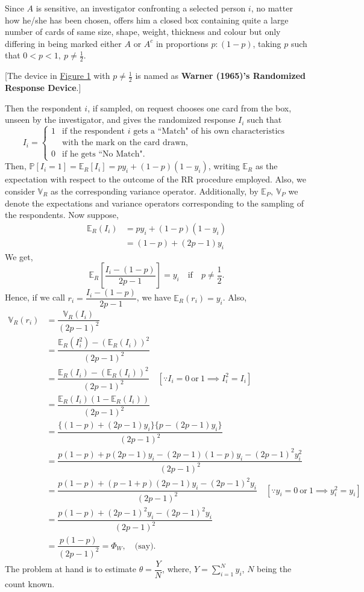 \documentclass[12pt]{article}
\newcommand{\prob}{\mathbb{P}}
\newcommand{\E}{\mathbb{E}}
\newcommand{\Var}{\mathbb{V}}
\theoremstyle{definition}
\begin{document}
Since $A$ is sensitive, an investigator confronting a selected person $i$, no matter how he/she has been chosen, offers him a closed box containing quite a large number of cards of same size, shape, weight, thickness and colour but only differing in being marked either $A$ or $A^c$ in proportions $p:(1-p)$, taking $p$ such that $0<p<1,\ p\neq\frac{1}{2}$.

[The device in \hyperref[SS1]{Figure 1} with $p\neq\frac{1}{2}$ is named as \textbf{Warner (1965)'s Randomized Response Device}.]

Then the respondent $i$, if sampled, on request chooses one card from the box, unseen by the investigator, and gives the randomized response $I_i$ such that
$$I_i= 
\begin{cases}
1 & \text{if the respondent $i$ gets a ``Match" of his own characteristics }\\
& \text{with the mark on the card drawn,}\\
0 & \text{if he gets ``No Match".}
\end{cases}$$
Then, $\prob[I_i=1]=\E_R[I_i]=p y_i +(1-p)(1-y_i)$, writing $\E_R$ as the expectation with respect to the outcome of the RR procedure employed. Also, we consider $\Var_R$ as the corresponding variance operator. Additionally, by $\E_P,\ \Var_P$ we denote the expectations and variance operators corresponding to the sampling of the respondents. Now suppose,
\begin{align*}
    \E_R(I_i) & = py_i +(1-p)(1-y_i)\\
    & = (1-p)+(2p-1)y_i
\end{align*}
We get, 
$$\E_R \left[ \dfrac{I_i-(1-p)}{2p-1} \right]=y_i\quad \text{if}\quad p\neq \frac{1}{2}.$$
Hence, if we call $r_i = \dfrac{I_i-(1-p)}{2p-1}$, we have $\E_R(r_i)=y_i$. Also,
\begin{align*}
    \Var_R(r_i) & = \dfrac{\Var_R(I_i)}{(2p-1)^2}\\
    & = \dfrac{\E_R(I_i^2)-(\E_R(I_i))^2}{(2p-1)^2}\\
    & = \dfrac{\E_R(I_i)-(\E_R(I_i))^2}{(2p-1)^2}\quad [\because I_i=0\ \text{or}\ 1 \implies I_i^2=I_i] \\
    & = \dfrac{\E_R(I_i)(1-\E_R(I_i))}{(2p-1)^2}\\
    & = \dfrac{\{(1-p)+(2p-1)y_i\}\{p-(2p-1)y_i\}}{(2p-1)^2}\\
    & = \dfrac{p(1-p)+p(2p-1)y_i-(2p-1)(1-p)y_i-(2p-1)^2y_i^2}{(2p-1)^2}\\
    & = \dfrac{p(1-p)+(p-1+p)(2p-1)y_i-(2p-1)^2y_i}{(2p-1)^2}\quad [\because y_i=0\ \text{or}\ 1 \implies y_i^2=y_i]\\
    & = \dfrac{p(1-p)+(2p-1)^2y_i-(2p-1)^2y_i}{(2p-1)^2}\\
    & = \dfrac{p(1-p)}{(2p-1)^2} = \Phi_W, \quad \text{(say)}. 
\end{align*}
The problem at hand is to estimate $\theta = \dfrac{Y}{N}$, where, $Y=\displaystyle\sum_{i=1}^N y_i$, $N$ being the count known. 
\end{document}
